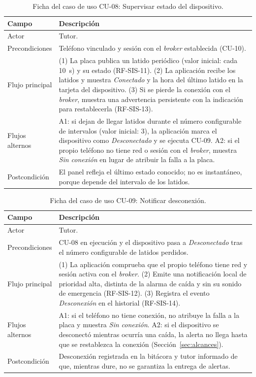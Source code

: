 \documentclass[12pt,a4paper,oneside]{book}
\theoremstyle{plain}
\theoremstyle{definition}
\theoremstyle{remark}
\begin{document}
\begin{table}[H]
\centering
\caption{Ficha del caso de uso CU-08: Supervisar estado del dispositivo.}
\label{tab:cu-08}
\small
\begin{tabular}{L{3.0cm}L{9.0cm}}
\toprule
\textbf{Campo} & \textbf{Descripción} \\
\midrule
Actor & Tutor. \\
\addlinespace
Precondiciones & Teléfono vinculado y sesión con el \textit{broker} establecida (CU-10). \\
\addlinespace
Flujo principal & (1) La placa publica un latido periódico (valor inicial: cada 10~s) y su estado (RF-SIS-11). (2) La aplicación recibe los latidos y muestra \textit{Conectado} y la hora del último latido en la tarjeta del dispositivo. (3) Si se pierde la conexión con el \textit{broker}, muestra una advertencia persistente con la indicación para restablecerla (RF-SIS-13). \\
\addlinespace
Flujos alternos & A1: si dejan de llegar latidos durante el número configurable de intervalos (valor inicial: 3), la aplicación marca el dispositivo como \textit{Desconectado} y se ejecuta CU-09. A2: si el propio teléfono no tiene red o sesión con el \textit{broker}, muestra \textit{Sin conexión} en lugar de atribuir la falla a la placa. \\
\addlinespace
Postcondición & El panel refleja el último estado conocido; no es instantáneo, porque depende del intervalo de los latidos. \\
\bottomrule
\end{tabular}
\end{table}

\begin{table}[H]
\centering
\caption{Ficha del caso de uso CU-09: Notificar desconexión.}
\label{tab:cu-09}
\small
\begin{tabular}{L{3.0cm}L{9.0cm}}
\toprule
\textbf{Campo} & \textbf{Descripción} \\
\midrule
Actor & Tutor. \\
\addlinespace
Precondiciones & CU-08 en ejecución y el dispositivo pasa a \textit{Desconectado} tras el número configurable de latidos perdidos. \\
\addlinespace
Flujo principal & (1) La aplicación comprueba que el propio teléfono tiene red y sesión activa con el \textit{broker}. (2) Emite una notificación local de prioridad alta, distinta de la alarma de caída y sin su sonido de emergencia (RF-SIS-12). (3) Registra el evento \textit{Desconexión} en el historial (RF-SIS-14). \\
\addlinespace
Flujos alternos & A1: si el teléfono no tiene conexión, no atribuye la falla a la placa y muestra \textit{Sin conexión}. A2: si el dispositivo se desconectó mientras ocurría una caída, la alerta no llega hasta que se restablezca la conexión (Sección~\ref{sec:alcances}). \\
\addlinespace
Postcondición & Desconexión registrada en la bitácora y tutor informado de que, mientras dure, no se garantiza la entrega de alertas. \\
\bottomrule
\end{tabular}
\end{table}
\end{document}

